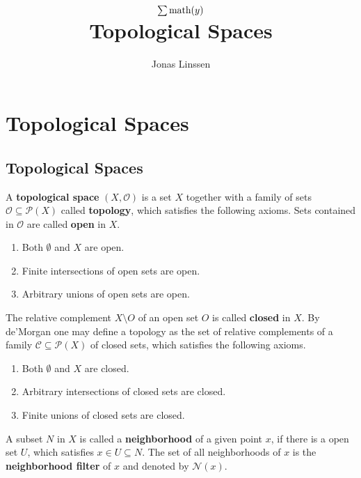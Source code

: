 

\title{$\sum \text{math}(y)$\\Topological Spaces}
\author{Jonas Linssen}



\maketitle
\tableofcontents

\newpage
\section{Topological Spaces}
\subsection{Topological Spaces}

\begin{definition}
	A \textbf{topological space} $(X,\mathcal{O})$ is a set $X$ together with a family of sets $\mathcal{O} \subseteq \mathcal{P}(X)$ called \textbf{topology}, which satisfies the following axioms. Sets contained in $\mathcal{O}$ are called \textbf{open} in $X$.
	\begin{enumerate}[$\bullet$]
		\item{
			Both $\emptyset$ and $X$ are open.
		}
		\item{
			Finite intersections of open sets are open.
		}
		\item{
			Arbitrary unions of open sets are open.
		}
	\end{enumerate}
	The relative complement $X \setminus O$ of an open set $O$ is called \textbf{closed} in $X$. By de'Morgan one may define a topology as the set of relative complements of a family $\mathcal{C} \subseteq \mathcal{P}(X)$ of closed sets, which satisfies the following axioms.
	\begin{enumerate}[$\bullet$]
		\item{
			Both $\emptyset$ and $X$ are closed.
		}
		\item{
			Arbitrary intersections of closed sets are closed.
		}
		\item{
			Finite unions of closed sets are closed.
		}
	\end{enumerate}

	A subset $N$ in $X$ is called a \textbf{neighborhood} of a given point $x$, if there is a open set $U$, which satisfies $x \in U \subseteq N$. The set of all neighborhoods of $x$ is the \textbf{neighborhood filter} of $x$ and denoted by $\mathcal{N}(x)$.
\end{definition}

